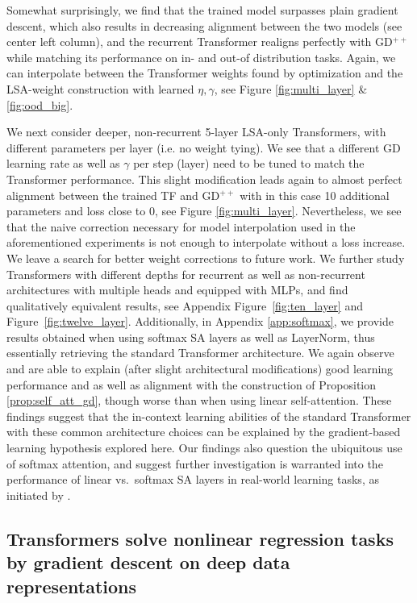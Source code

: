 \documentclass{article}
\theoremstyle{plain}
\theoremstyle{definition}
\theoremstyle{remark}
\begin{document}
Somewhat surprisingly, we find that the trained model surpasses plain gradient descent, which also results in decreasing alignment between the two models (see center left column), and the recurrent Transformer realigns perfectly with GD$^{++}$ while matching its performance on in- and out-of distribution tasks. Again, we can interpolate between the Transformer weights found by optimization and the LSA-weight construction with learned $\eta, \gamma$, see Figure \ref{fig:multi_layer} \& \ref{fig:ood_big}.

We next consider deeper, non-recurrent 5-layer LSA-only Transformers, with different parameters per layer (i.e. no weight tying). We see that a different GD learning rate as well as $\gamma$ per step (layer) need to be tuned to match the Transformer performance. This slight modification leads again to almost perfect alignment between the trained TF and GD$^{++}$ with in this case 10 additional parameters and loss close to 0, see Figure \ref{fig:multi_layer}.
Nevertheless, we see that the naive correction necessary for model interpolation used in the aforementioned experiments is not enough to interpolate without a loss increase. We leave a search for better weight corrections to future work. We further study Transformers with different depths for recurrent as well as non-recurrent architectures with multiple heads and equipped with MLPs, and find qualitatively equivalent results, see Appendix Figure~\ref{fig:ten_layer} and Figure~\ref{fig:twelve_layer}. Additionally, in Appendix \ref{app:softmax}, we provide results obtained when using softmax SA layers as well as LayerNorm, thus essentially retrieving the standard Transformer architecture. We again observe and are able to explain (after slight architectural modifications) good learning performance and as well as alignment with the construction of Proposition \ref{prop:self_att_gd}, though worse than when using linear self-attention. These findings suggest that the in-context learning abilities of the standard Transformer with these common architecture choices can be explained by the gradient-based learning hypothesis explored here. Our findings also question the ubiquitous use of softmax attention, and suggest further investigation is warranted into the performance of linear vs.~softmax SA layers in real-world learning tasks, as initiated by \citet{linear_transformers_fast_weight}.

\subsection*{Transformers solve nonlinear regression tasks by gradient descent on deep data representations}
\end{document}
